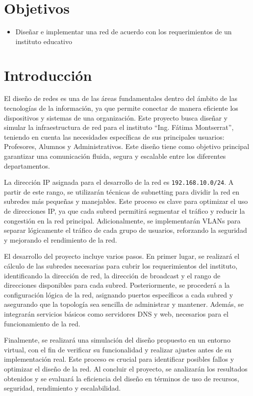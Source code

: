 \setcounter{page}{1}

\section{Objetivos}
    \begin{itemize}
        \item Diseñar e implementar una red de acuerdo con los requerimientos de un instituto educativo
    \end{itemize}

\section{Introducción}

El diseño de redes es una de las áreas fundamentales dentro del ámbito de las tecnologías de la información, ya que permite conectar de manera eficiente los dispositivos y sistemas de una organización. Este proyecto busca diseñar y simular la infraestructura de red para el instituto “Ing. Fátima Montserrat”, teniendo en cuenta las necesidades específicas de sus principales usuarios: Profesores, Alumnos y Administrativos. Este diseño tiene como objetivo principal garantizar una comunicación fluida, segura y escalable entre los diferentes departamentos.

La dirección IP asignada para el desarrollo de la red es \texttt{192.168.10.0/24}. A partir de este rango, se utilizarán técnicas de subnetting para dividir la red en subredes más pequeñas y manejables. Este proceso es clave para optimizar el uso de direcciones IP, ya que cada subred permitirá segmentar el tráfico y reducir la congestión en la red principal. Adicionalmente, se implementarán VLANs para separar lógicamente el tráfico de cada grupo de usuarios, reforzando la seguridad y mejorando el rendimiento de la red.

El desarrollo del proyecto incluye varios pasos. En primer lugar, se realizará el cálculo de las subredes necesarias para cubrir los requerimientos del instituto, identificando la dirección de red, la dirección de broadcast y el rango de direcciones disponibles para cada subred. Posteriormente, se procederá a la configuración lógica de la red, asignando puertos específicos a cada subred y asegurando que la topología sea sencilla de administrar y mantener. Además, se integrarán servicios básicos como servidores DNS y web, necesarios para el funcionamiento de la red.

Finalmente, se realizará una simulación del diseño propuesto en un entorno virtual, con el fin de verificar su funcionalidad y realizar ajustes antes de su implementación real. Este proceso es crucial para identificar posibles fallos y optimizar el diseño de la red. Al concluir el proyecto, se analizarán los resultados obtenidos y se evaluará la eficiencia del diseño en términos de uso de recursos, seguridad, rendimiento y escalabilidad.


